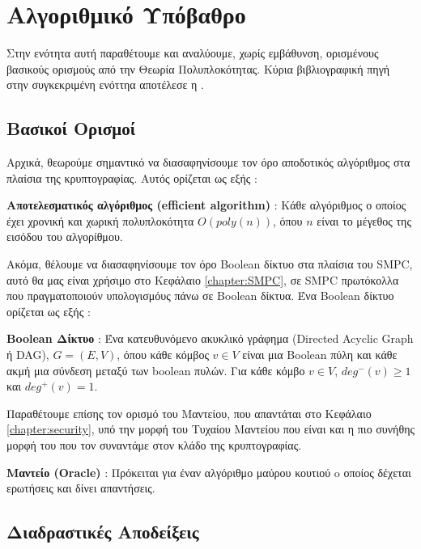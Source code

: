 \section{Αλγοριθμικό Υπόβαθρο}
\label{section:algorithmic-background}

Στην ενότητα αυτή παραθέτουμε και αναλύουμε, χωρίς εμβάθυνση, ορισμένους βασικούς ορισμούς από την Θεωρία Πολυπλοκότητας. Κύρια βιβλιογραφική πηγή στην συγκεκριμένη ενόττηα αποτέλεσε η \cite{Bauer2011}.

\subsection{Βασικοί Ορισμοί}

Αρχικά, θεωρούμε σημαντικό να διασαφηνίσουμε τον όρο αποδοτικός αλγόριθμος στα πλαίσια της κρυπτογραφίας. Αυτός ορίζεται ως εξής :

\begin{definition}
\textbf{Αποτελεσματικός αλγόριθμος (efficient algorithm)} : Κάθε αλγόριθμος ο οποίος έχει χρονική και χωρική πολυπλοκότητα $O(poly(n))$, όπου $n$ είναι το μέγεθος της εισόδου του αλγορίθμου.
\end{definition}

Ακόμα, θέλουμε να διασαφηνίσουμε τον όρο Boolean δίκτυο στα πλαίσια του SMPC, αυτό θα μας είναι χρήσιμο στο Κεφάλαιο \ref{chapter:SMPC}, σε SMPC πρωτόκολλα που πραγματοποιούν υπολογισμόυς πάνω σε Boolean δίκτυα. Ένα Boolean δίκτυο ορίζεται ως εξής :

\begin{definition}
\textbf{Boolean Δίκτυο} : Ένα κατευθυνόμενο ακυκλικό γράφημα (Directed Acyclic Graph ή DAG), $G=(E, V)$, όπου κάθε κόμβος $v \in V$ είναι μια Boolean πύλη και κάθε ακμή μια σύνδεση μεταξύ των boolean πυλών. Για κάθε κόμβο $v \in V$, $deg^-(v) \ge 1$ και $deg^+(v) = 1$.
\end{definition}

Παραθέτουμε επίσης τον ορισμό του Μαντείου, που απαντάται στο Κεφάλαιο \ref{chapter:security}, υπό την μορφή του Τυχαίου Μαντείου που είναι και η πιο συνήθης μορφή του που τον συναντάμε στον κλάδο της κρυπτογραφίας.

\begin{definition}
\textbf{Μαντείο (Oracle)} : Πρόκειται για έναν αλγόριθμο μαύρου κουτιού o οποίος δέχεται ερωτήσεις και δίνει απαντήσεις.
\end{definition}

\subsection{Διαδραστικές Αποδείξεις}


